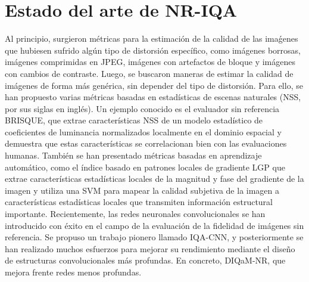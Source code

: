\section{Estado del arte de NR-IQA}
Al principio, surgieron métricas para la estimación de la calidad de las imaǵenes 
que hubiesen sufrido algún tipo de distorsión específico, 
como imágenes borrosas\cite{GradientBasedBlurAssessment}, 
imágenes comprimidas en JPEG\cite{JPEGBasedOnLuminance}, 
imágenes con artefactos de bloque\cite{DeblockedImages} y imágenes con cambios de contraste\cite{ContrastDistorted}.
Luego, se buscaron maneras de estimar la calidad de imágenes de forma más genérica, 
sin depender del tipo de distorsión. Para ello, se han propuesto varias métricas 
basadas en estadísticas de escenas naturales (NSS, por sus siglas en inglés). 
Un ejemplo conocido es el evaluador sin referencia BRISQUE\cite{BRISQUE}, que extrae 
características NSS de un modelo estadístico de coeficientes de luminancia 
normalizados localmente en el dominio espacial y demuestra que estas características 
se correlacionan bien con las evaluaciones humanas.
También se han presentado métricas basadas en aprendizaje automático, 
como el índice basado en patrones locales de gradiente LGP\cite{LGP} que extrae 
características estadísticas locales de la magnitud y fase del gradiente de la imagen y utiliza una 
SVM para mapear la calidad subjetiva de la imagen a 
características estadísticas locales que transmiten información estructural importante.
Recientemente, las redes neuronales convolucionales se han introducido con 
éxito en el campo de la evaluación de la fidelidad de imágenes sin referencia. 
Se propuso un trabajo pionero llamado IQA-CNN\cite{IQA-CNN}, 
y posteriormente se han realizado muchos esfuerzos para mejorar su rendimiento 
mediante el diseño de estructuras convolucionales más profundas. En concreto,
DIQaM-NR\cite{DIQaM}, que mejora frente redes menos profundas.


